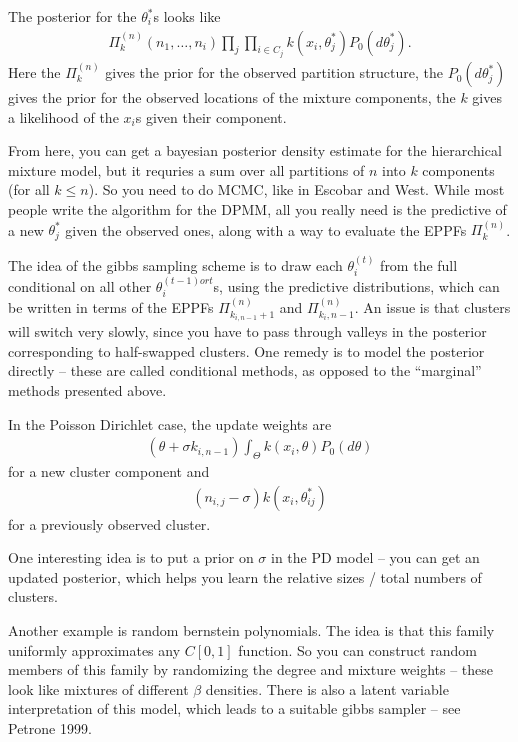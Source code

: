 \documentclass{article}
\begin{document}
The posterior for the $\theta_{i}^{\ast}$s looks like
\begin{align}
\Pi_{k}^{(n)}\left(n_{1}, \dots, n_{i}\right) \prod_{j} \prod_{i \in C_{j}} k\left(x_{i}, \theta_{j}^{\ast}\right) P_{0}\left(d\theta_{j}^{\ast}\right).
\end{align}
Here the $\Pi_{k}^{(n)}$ gives the prior for the observed partition structure,
the $P_{0}\left(d\theta_{j}^{\ast}\right)$ gives the prior for the observed
locations of the mixture components, the $k$ gives a likelihood of the $x_{i}$s
given their component.

From here, you can get a bayesian posterior density estimate for the
hierarchical mixture model, but it requries a sum over all partitions of $n$
into $k$ components (for all $k \leq n$). So you need to do MCMC, like in
Escobar and West. While most people write the algorithm for the DPMM, all you
really need is the predictive of a new $\theta_{j}^{\ast}$ given the observed
ones, along with a way to evaluate the EPPFs $\Pi_{k}^{(n)}$.

The idea of the gibbs sampling scheme is to draw each $\theta_{i}^{(t)}$ from
the full conditional on all other $\theta_{i}^{(t-1) or t}$s, using the
predictive distributions, which can be written in terms of the EPPFs
$\Pi_{k_{i, n - 1} + 1}^{(n)}$ and $\Pi_{k_{i}, n -1}^{(n)}$. An issue is that
clusters will switch very slowly, since you have to pass through valleys in the
posterior corresponding to half-swapped clusters. One remedy is to model the
posterior directly -- these are called conditional methods, as opposed to the
``marginal'' methods presented above.

In the Poisson Dirichlet case, the update weights are 
\begin{align}
\left(\theta + \sigma k_{i, n - 1}\right) \int_{\Theta}k\left(x_{i}, \theta\right)P_{0}\left(d\theta\right)
\end{align}
for a new cluster component and
\begin{align}
\left(n_{i, j} - \sigma\right)k\left(x_{i}, \theta_{ij}^{\ast}\right)
\end{align}
for a previously observed cluster.

One interesting idea is to put a prior on $\sigma$ in the PD model -- you can
get an updated posterior, which helps you learn the relative sizes / total
numbers of clusters.

Another example is random bernstein polynomials. The idea is that this family
uniformly approximates any $C\left[0, 1\right]$ function. So you can construct
random members of this family by randomizing the degree and mixture weights --
these look like mixtures of different $\beta$ densities. There is also a latent
variable interpretation of this model, which leads to a suitable gibbs sampler
-- see Petrone 1999.
\end{document}
